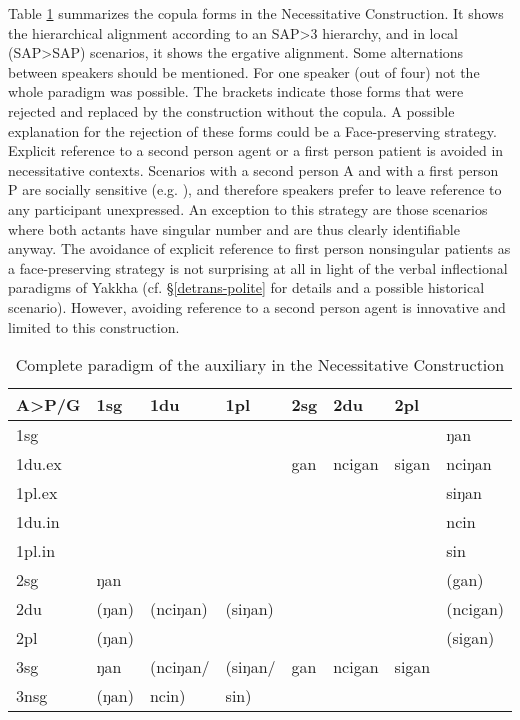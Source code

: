 Table \ref{cop-agree} summarizes the copula forms in the Necessitative Construction. It shows the hierarchical alignment according to an SAP>3 hierarchy, and in local (SAP>SAP) scenarios, it shows the ergative alignment. Some alternations between speakers should be mentioned. For one speaker (out of four) not the whole paradigm was possible. The brackets indicate those forms that were rejected and replaced by the construction without the copula. A possible explanation for the rejection of these forms could be a Face-preserving strategy. Explicit reference to a second person agent or a first person patient is avoided in necessitative contexts. Scenarios with a second person A and with a first person P are socially sensitive (e.g. ), and therefore speakers prefer to leave reference to any participant unexpressed. An exception to this strategy are those scenarios where both actants have singular number and  are thus clearly identifiable anyway. The avoidance of explicit reference to first person nonsingular patients as a face-preserving strategy is not surprising at all in light of the verbal inflectional paradigms of Yakkha (cf. §\ref{detrans-polite} for details and a possible historical scenario). However, avoiding reference to a second person agent is innovative and limited to this construction.



\begin{table}[htp]
\begin{center}
\begin{tabular}{llllllll}
\hline
{\bf A>P/G} 	&	{\sc 1sg}&	{\sc 1du}& {\sc 1pl} &{\sc 2sg}&{\sc 2du}&{\sc 2pl}&{\sc 3 }\\
\hline
{\sc 1sg}  		&\multicolumn{3}{c||}{\cellcolor[gray]{.8}}	& &&				& ŋan  \\
{\sc  1du.ex}   &\multicolumn{3}{c||}{\cellcolor[gray]{.8}}	&gan&ncigan&sigan	& nciŋan  \\
{\sc 1pl.ex}   	&\multicolumn{3}{c||}{\cellcolor[gray]{.8}}	& &&				& siŋan \\
\cline{5-7}
{\sc 1du.in}   	&\multicolumn{6}{c||}{\cellcolor[gray]{.8}}				& ncin  \\
{\sc 1pl.in}   	&\multicolumn{6}{c||}{\cellcolor[gray]{.8}}	 					& sin  \\
\hline
{\sc 2sg}  		& ŋan	& & &\multicolumn{3}{c||}{\cellcolor[gray]{.8}}	& (gan) \\
\cline{2-2}
{\sc 2du}  	& (ŋan)& (nciŋan) &  (siŋan)	&\multicolumn{3}{c||}{\cellcolor[gray]{.8}}&  (ncigan) \\
{\sc 2pl}  	& (ŋan) &  &	&\multicolumn{3}{c||}{\cellcolor[gray]{.8}}			&  (sigan) \\
\hline 
{\sc 3sg}  	& ŋan	&  (nciŋan/&(siŋan/	 & gan&ncigan& sigan&\cellcolor[gray]{.8}\\
\cline{2-2}
{\sc 3nsg}  &  (ŋan)&ncin)  & 	sin)				&&&							&\cellcolor[gray]{.8} \\
\hline
\end{tabular}
\caption{Complete paradigm of the auxiliary in the Necessitative Construction}\label{cop-agree}
\end{center}
\end{table}


